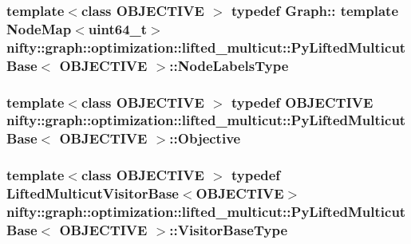 \subsubsection[{Node\+Labels\+Type}]{\setlength{\rightskip}{0pt plus 5cm}template$<$class O\+B\+J\+E\+C\+T\+I\+V\+E $>$ typedef Graph\+:: template Node\+Map$<$uint64\+\_\+t$>$ {\bf nifty\+::graph\+::optimization\+::lifted\+\_\+multicut\+::\+Py\+Lifted\+Multicut\+Base}$<$ O\+B\+J\+E\+C\+T\+I\+V\+E $>$\+::{\bf Node\+Labels\+Type}}\label{classnifty_1_1graph_1_1optimization_1_1lifted__multicut_1_1PyLiftedMulticutBase_aff32f923ac202e928a33e375bf979497}
\hypertarget{classnifty_1_1graph_1_1optimization_1_1lifted__multicut_1_1PyLiftedMulticutBase_aebb82b4b2afd6026d12565580f07fac3}{}
\subsubsection[{Objective}]{\setlength{\rightskip}{0pt plus 5cm}template$<$class O\+B\+J\+E\+C\+T\+I\+V\+E $>$ typedef O\+B\+J\+E\+C\+T\+I\+V\+E {\bf nifty\+::graph\+::optimization\+::lifted\+\_\+multicut\+::\+Py\+Lifted\+Multicut\+Base}$<$ O\+B\+J\+E\+C\+T\+I\+V\+E $>$\+::{\bf Objective}}\label{classnifty_1_1graph_1_1optimization_1_1lifted__multicut_1_1PyLiftedMulticutBase_aebb82b4b2afd6026d12565580f07fac3}
\hypertarget{classnifty_1_1graph_1_1optimization_1_1lifted__multicut_1_1PyLiftedMulticutBase_ac8cdcdeb2751c508a445e4d1a66411f6}{}
\subsubsection[{Visitor\+Base\+Type}]{\setlength{\rightskip}{0pt plus 5cm}template$<$class O\+B\+J\+E\+C\+T\+I\+V\+E $>$ typedef {\bf Lifted\+Multicut\+Visitor\+Base}$<$O\+B\+J\+E\+C\+T\+I\+V\+E$>$ {\bf nifty\+::graph\+::optimization\+::lifted\+\_\+multicut\+::\+Py\+Lifted\+Multicut\+Base}$<$ O\+B\+J\+E\+C\+T\+I\+V\+E $>$\+::{\bf Visitor\+Base\+Type}}\label{classnifty_1_1graph_1_1optimization_1_1lifted__multicut_1_1PyLiftedMulticutBase_ac8cdcdeb2751c508a445e4d1a66411f6}


